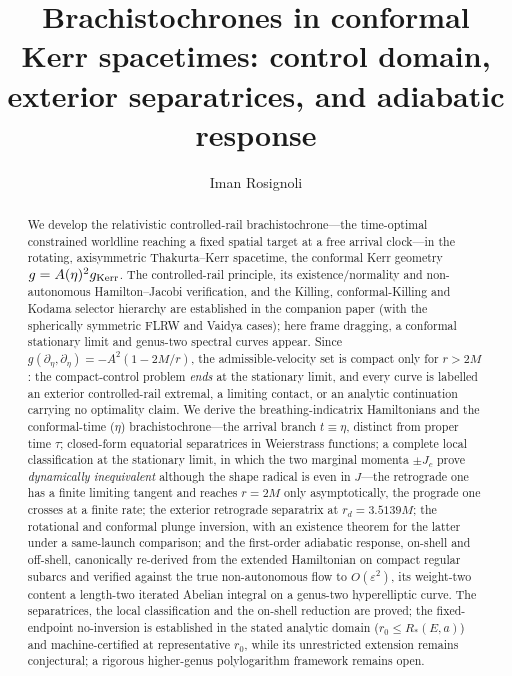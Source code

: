 \documentclass[12pt]{iopart}
\theoremstyle{plain}
\theoremstyle{definition}
\theoremstyle{remark}
\begin{document}
\title{Brachistochrones in conformal Kerr spacetimes:
control domain, exterior separatrices, and adiabatic response}

\author{Iman Rosignoli}
\address{Department of Physics, University of Pavia, Via A.\ Bassi 6, 27100 Pavia, Italy}

\begin{abstract}
We develop the relativistic controlled-rail brachistochrone---the time-optimal constrained
worldline reaching a fixed spatial target at a free arrival clock---in the rotating,
axisymmetric Thakurta--Kerr spacetime, the conformal Kerr geometry $g=A(\eta)^2 g_{\rm
Kerr}$. The controlled-rail principle, its existence/normality and non-autonomous
Hamilton--Jacobi verification, and the Killing, conformal-Killing and Kodama selector
hierarchy are established in the companion paper (with the spherically symmetric FLRW and
Vaidya cases); here frame dragging, a conformal stationary limit and genus-two spectral
curves appear. Since $g(\partial_\eta,\partial_\eta)=-A^2(1-2M/r)$, the admissible-velocity
set is compact only for $r>2M$: the compact-control problem \emph{ends} at the stationary
limit, and every curve is labelled an exterior controlled-rail extremal, a limiting
contact, or an analytic continuation carrying no optimality claim. We derive the
breathing-indicatrix Hamiltonians and the conformal-time ($\eta$)
brachistochrone---the arrival branch $t\equiv\eta$, distinct from proper time $\tau$;
closed-form equatorial separatrices in Weierstrass functions; a complete local
classification at the stationary limit, in which the two marginal momenta $\pm J_c$ prove
\emph{dynamically inequivalent} although the shape radical is even in $J$---the retrograde
one has a finite limiting tangent and reaches $r=2M$ only asymptotically, the prograde one
crosses at a finite rate; the exterior retrograde separatrix at $r_d=3.5139M$; the
rotational and conformal plunge inversion, with an existence theorem for the latter under
a same-launch comparison; and the first-order adiabatic response, on-shell and off-shell,
canonically re-derived from the extended Hamiltonian on compact regular subarcs and
verified against the true non-autonomous flow to $O(\varepsilon^2)$, its weight-two
content a length-two iterated Abelian integral on a genus-two hyperelliptic curve. The
separatrices, the local classification and the on-shell reduction are proved; the
fixed-endpoint no-inversion is established in the stated analytic domain
($r_0\le R_\ast(E,a)$) and machine-certified at representative $r_0$, while its
unrestricted extension remains conjectural; a rigorous higher-genus polylogarithm
framework remains open.
\end{abstract}
\end{document}
